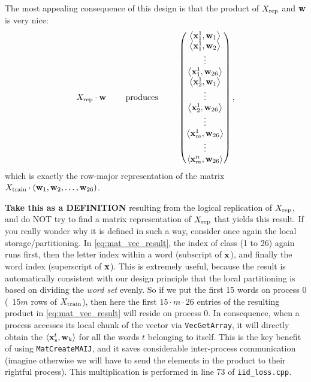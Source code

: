 \documentclass[11pt]{report}
\begin{document}
The most appealing consequence of this design is that the product of $X_{\text{rep}}$ and $\mathbf{\boldsymbol{w}}$ is very nice:
\begin{align}
\label{eq:mat_vec_result}
  X_{\text{rep}} \cdot \mathbf{\boldsymbol{w}} \qquad \text{ produces } \qquad
  \begin{pmatrix}
    \left\langle \mathbf{\boldsymbol{x}}^1_1,\mathbf{\boldsymbol{w}}_1 \right\rangle \\
    \left\langle \mathbf{\boldsymbol{x}}^1_1,\mathbf{\boldsymbol{w}}_2 \right\rangle \\
    \vdots \\
    \left\langle \mathbf{\boldsymbol{x}}^1_1,\mathbf{\boldsymbol{w}}_{26} \right\rangle \\
    \left\langle \mathbf{\boldsymbol{x}}^1_2,\mathbf{\boldsymbol{w}}_1 \right\rangle \\
    \vdots \\
    \left\langle \mathbf{\boldsymbol{x}}^1_2,\mathbf{\boldsymbol{w}}_{26} \right\rangle \\
    \vdots \\
    \left\langle \mathbf{\boldsymbol{x}}^1_m,\mathbf{\boldsymbol{w}}_{26} \right\rangle \\
    \vdots \\
    \left\langle \mathbf{\boldsymbol{x}}^n_m,\mathbf{\boldsymbol{w}}_{26} \right\rangle
  \end{pmatrix},
\end{align}
%
which is exactly the row-major representation of the matrix
$X_{\text{train}} \cdot (\mathbf{\boldsymbol{w}}_1, \mathbf{\boldsymbol{w}}_2, \ldots, \mathbf{\boldsymbol{w}}_{26})$.

{\bf Take this as a DEFINITION} resulting from the logical replication of $X_{\text{rep}}$,
and do NOT try to find a matrix representation of $X_{\text{rep}}$ that yields this result.
If you really wonder why it is defined in such a way, consider once again the local storage/partitioning.
In \eqref{eq:mat_vec_result}, the index of class (1 to 26) again runs first,
then the letter index within a word (subscript of $\mathbf{\boldsymbol{x}}$),
and finally the word index (superscript of $\mathbf{\boldsymbol{x}}$).
This is extremely useful,
because the result is automatically consistent with our design principle that
the local partitioning is based on dividing the \emph{word set} evenly.
So if we put the first 15 words on process 0 (\ie\ $15m$ rows of $X_{\text{train}}$),
then here the first $15 \cdot m \cdot  26$ entries of the resulting product in \eqref{eq:mat_vec_result} will reside on process 0.
In consequence, when a process accesses its local chunk of the vector via \verb!VecGetArray!,
it will directly obtain the $\left\langle \mathbf{\boldsymbol{x}}^t_s,\mathbf{\boldsymbol{w}}_k \right\rangle$ for all the words $t$ belonging to itself.
This is the key benefit of using \verb!MatCreateMAIJ!,
and it saves considerable inter-process communication
(imagine otherwise we will have to send the elements in the product to their rightful process).
This multiplication is performed in line 73 of \verb!iid_loss.cpp!.
\end{document}

